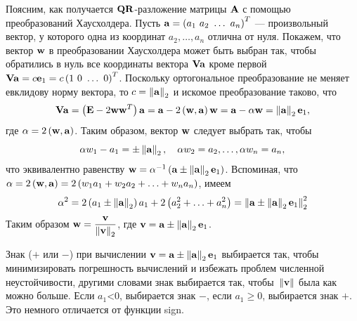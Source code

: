 \documentclass[12pt]{article}
\begin{document}
    Поясним, как получается $\bold{QR}$-разложение матрицы $\bold{A}$ с помощью преобразований Хаусхолдера. Пусть $\bold{a}=\left(a_1\,\, a_2\,\, \ldots \,\, a_n\right)^T$ --- произвольный вектор, у которого одна из координат $a_2,\ldots,a_n$ отлична от нуля. Покажем, что вектор $\bold{w}$ в преобразовании Хаусхолдера может быть выбран так, чтобы обратились в нуль все координаты вектора $\bold{Va}$ кроме первой $\bold{Va}=c\bold{e}_1=c\left(1\,\, 0 \,\, \ldots \,\, 0\right)^T$. Поскольку ортогональное преобразование не меняет евклидову норму вектора, то $c=\left\|\bold{a}\right\|_2$ и искомое преобразование таково, что
    \begin{equation}
    	\bold{Va}=\left(\bold{E}-2\bold{ww}^{T}\right)\bold{a}=\bold{a}-2\left(\bold{w},\bold{a}\right)\bold{w}=\bold{a}-\alpha\bold{w}=\left\|\bold{a}\right\|_2\bold{e}_1,
    \end{equation}
    где $\alpha=2\left(\bold{w},\bold{a}\right)$. Таким образом, вектор $\bold{w}$ следует выбрать так, чтобы
    \begin{equation}
    	\alpha w_1-a_1=\pm \left\|\bold{a}\right\|_2,\quad \alpha w_2=a_2,\ldots,\alpha w_n=a_n,
    \end{equation}
    что эквивалентно равенству $\bold{w}=\alpha^{-1}\left(\bold{a}\pm\left\|\bold{a}\right\|_2\bold{e}_1\right)$. Вспоминая, что\linebreak $\alpha=2\left(\bold{w},\bold{a}\right)=2\left(w_1a_1+w_2a_2+\ldots+w_na_n\right)$, имеем
    \begin{equation}
    	\alpha^2=2\left(a_1\pm\left\|\bold{a}\right\|_2\right)a_1+2\left(a_2^2+\ldots+a^2_n\right)=\left\|\bold{a}\pm \left\|\bold{a}\right\|_2\bold{e}_1\right\|^2_2
    \end{equation}
    Таким образом $\bold{w}=\dfrac{\bold{v}}{\left\|\bold{v}\right\|_2}$, где $\bold{v}=\bold{a}\pm \left\|\bold{a}\right\|_2 \bold{e}_1$.
    
    Знак ($+$ или $-$) при вычислении $\bold{v}=\bold{a}\pm \left\|\bold{a}\right\|_2 \bold{e}_1$​ выбирается так, чтобы минимизировать погрешность вычислений и избежать проблем численной неустойчивости, другими словами знак выбирается так, чтобы~$\left\|\bold{v}\right\|$ была как можно больше. Если $a_1$<0, выбирается знак $-$, если $a_1\geqslant 0$, выбирается знак $+$. Это немного отличается от функции sign.
    
\end{document}
